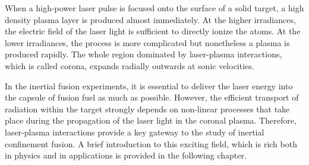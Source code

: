 When a high-power laser pulse is focused onto the surface of a solid target, a high density plasma layer is produced almost immediately. At the higher irradiances, the electric field of the laser light is sufficient to directly ionize the atoms. At the lower irradiances, the process is more complicated but nonetheless a plasma is produced rapidly. The whole region dominated by laser-plasma interactions, which is called corona, expands radially outwards at sonic velocities.

In the inertial fusion experiments, it is essential to deliver the laser energy into the capsule of fusion fuel as much as possible. However, the efficient transport of radiation within the target strongly depends on non-linear processes that take place during the propagation of the laser light in the coronal plasma. Therefore, laser-plasma interactions provide a key gateway to the study of inertial confinement fusion. A brief introduction to this exciting field, which is rich both in physics and in applications is provided in the following chapter. 